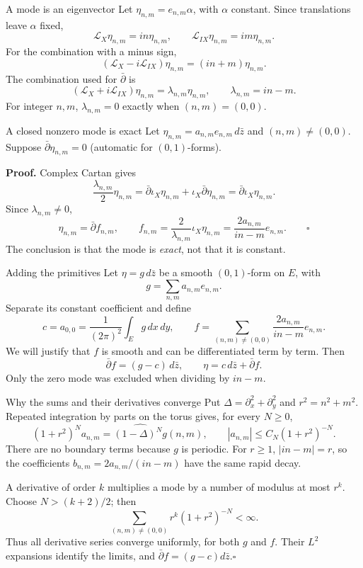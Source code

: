 \documentclass[aspectratio=169,11pt]{beamer}
\newcommand{\db}{\bar\partial}
\newcommand{\Lie}{\mathcal L}
\newcommand{\ee}{e_{n,m}}
\begin{document}
\begin{frame}{A mode is an eigenvector}
Let $\eta_{n,m}=\ee\alpha$, with $\alpha$ constant.
Since translations leave $\alpha$ fixed,
\[
 \Lie_X\eta_{n,m}=in\eta_{n,m},\qquad
 \Lie_{IX}\eta_{n,m}=im\eta_{n,m}.
\]
For the combination with a minus sign,
\[
 (\Lie_X-i\Lie_{IX})\eta_{n,m}=(in+m)\eta_{n,m}.
\]
The combination used for $\db$ is
\[
 (\Lie_X+i\Lie_{IX})\eta_{n,m}
 =\lambda_{n,m}\eta_{n,m},\qquad\lambda_{n,m}=in-m.
\]
For integer $n,m$, $\lambda_{n,m}=0$ exactly when $(n,m)=(0,0)$.
\end{frame}

\begin{frame}{A closed nonzero mode is exact}
Let $\eta_{n,m}=a_{n,m}\ee\,d\bar z$ and $(n,m)\ne(0,0)$.
Suppose $\db\eta_{n,m}=0$ (automatic for $(0,1)$-forms).

\textbf{Proof.} Complex Cartan gives
\[
 \frac{\lambda_{n,m}}2\eta_{n,m}
 =\db\iota_X\eta_{n,m}+\iota_X\db\eta_{n,m}
 =\db\iota_X\eta_{n,m}.
\]
Since $\lambda_{n,m}\ne0$,
\[
 \eta_{n,m}=\db f_{n,m},\qquad
 f_{n,m}=\frac{2}{\lambda_{n,m}}\iota_X\eta_{n,m}
 =\frac{2a_{n,m}}{in-m}\ee.\qquad\square
\]
The conclusion is that the mode is \emph{exact}, not that it is constant.
\end{frame}

\begin{frame}{Adding the primitives}
Let $\eta=g\,d\bar z$ be a smooth $(0,1)$-form on $E$, with
\[
 g=\sum_{n,m}a_{n,m}\ee.
\]
Separate its constant coefficient and define
\[
 c=a_{0,0}=\frac1{(2\pi)^2}\int_E g\,dx\,dy,\qquad
 f=\sum_{(n,m)\ne(0,0)}\frac{2a_{n,m}}{in-m}\ee.
\]
We will justify that $f$ is smooth and can be differentiated term by term.
Then
\[
 \db f=(g-c)\,d\bar z,
 \qquad\boxed{\eta=c\,d\bar z+\db f.}
\]
Only the zero mode was excluded when dividing by $in-m$.
\end{frame}

\begin{frame}{Why the sums and their derivatives converge}
Put $\Delta=\partial_x^2+\partial_y^2$ and $r^2=n^2+m^2$.
Repeated integration by parts on the torus gives, for every $N\geq0$,
\[
 (1+r^2)^N a_{n,m}=\widehat{(1-\Delta)^N g}(n,m),
 \qquad |a_{n,m}|\leq C_N(1+r^2)^{-N}.
\]
There are no boundary terms because $g$ is periodic.
For $r\geq1$, $|in-m|=r$, so the coefficients
$b_{n,m}=2a_{n,m}/(in-m)$ have the same rapid decay.

A derivative of order $k$ multiplies a mode by a number of modulus at most
$r^k$. Choose $N>(k+2)/2$; then
\[
 \sum_{(n,m)\ne(0,0)} r^k(1+r^2)^{-N}<\infty.
\]
Thus all derivative series converge uniformly, for both $g$ and $f$.
Their $L^2$ expansions identify the limits, and $\db f=(g-c)d\bar z$.\hfill$\square$
\end{frame}
\end{document}
